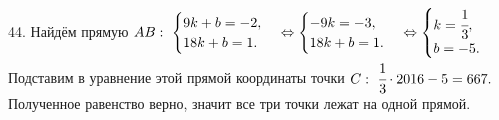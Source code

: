 44. Найдём прямую $AB:\ \begin{cases} 9k+b=-2,\\ 18k+b=1.\end{cases}\Leftrightarrow\begin{cases} -9k=-3,\\ 18k+b=1.\end{cases}
\Leftrightarrow\begin{cases} k=\cfrac{1}{3},\\ b=-5.\end{cases}$ Подставим в уравнение этой прямой координаты точки $C:\ \cfrac{1}{3}\cdot2016-5=667.$ Полученное равенство верно, значит все три точки лежат на одной прямой.\\
